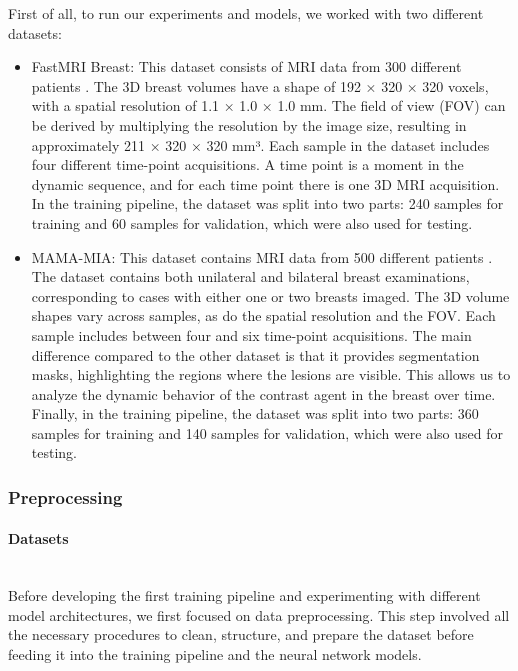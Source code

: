 \documentclass[12pt]{article}
\begin{document}
First of all, to run our experiments and models, we worked with two different datasets:

\begin{itemize}
    \item FastMRI Breast: This dataset consists of MRI data from 300 different patients \cite{Fastmribreast}.
    The 3D breast volumes have a shape of 192 × 320 × 320 voxels, with a spatial resolution of 1.1 × 1.0 × 1.0 mm.
    The field of view (FOV) can be derived by multiplying the resolution by the image size, resulting in approximately 211 × 320 × 320 mm³.
    Each sample in the dataset includes four different time-point acquisitions.
    A time point is a moment in the dynamic sequence, and for each time point there is one 3D MRI acquisition.
    In the training pipeline, the dataset was split into two parts: 240 samples for training and 60 samples for validation, which were also used for testing.
    \item MAMA-MIA: This dataset contains MRI data from 500 different patients \cite{Mamamia}.
    The dataset contains both unilateral and bilateral breast examinations, corresponding to cases with either one or two breasts imaged.
    The 3D volume shapes vary across samples, as do the spatial resolution and the FOV.
    Each sample includes between four and six time-point acquisitions.
    The main difference compared to the other dataset is that it provides segmentation masks, highlighting the regions where the lesions are visible.
    This allows us to analyze the dynamic behavior of the contrast agent in the breast over time.
    Finally, in the training pipeline, the dataset was split into two parts: 360 samples for training and 140 samples for validation, which were also used for testing.

\end{itemize}

\subsubsection{Preprocessing}
\paragraph{Datasets}
\mbox{}\\
Before developing the first training pipeline and experimenting with different model architectures, we first focused on data preprocessing.
This step involved all the necessary procedures to clean, structure, and prepare the dataset before feeding it into the training pipeline and the neural network models.
\end{document}
